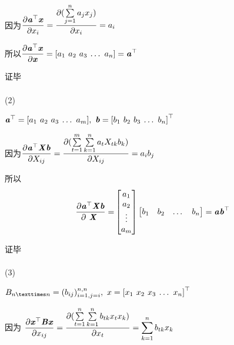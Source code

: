 \documentclass[UTF8]{ctexart}
\begin{document}
因为$\displaystyle{
    \frac{ \partial \mathbf{\textbf {\emph{a}}}^\top  \textbf {\emph{x}}  }
    { \partial \emph {$x_{i}$} } =
    \frac{ \partial ( \sum\limits_{j=1}\limits^n  \emph {$a_{j}$}  \emph {$x_{j}$}  )}
    { \partial \emph {$x_{i}$} }=
    \textbf{\emph {$a_{i}$}}}$



所以$\displaystyle{\frac{ \partial \mathbf{\textbf {\emph {a}}}^\top  \textbf {\emph {x}}  }
{ \partial \textbf{\emph {x}} }=
      [\emph {$a_{1}$\ $a_{2}$\ $a_{3}$\ …\ $a_{n}$}]=
    \mathbf{\textbf{\emph {a}}}^\top}$

证毕
\\
\\
(2)

$\mathbf{\textbf {\emph{a}}}^\top=[\emph {$a_{1}$\ $a_{2}$\ $a_{3}$\ …\ $a_{m}$}],
  \ \textbf {\emph{b}}=\mathbf{[\emph {$b_{1}$\ $b_{2}$\ $b_{3}$\ …\ $b_{n}$}]}^\top$

因为$\displaystyle{
    \frac{ \partial \mathbf{\textbf {\emph{a}}}^\top  \textbf {\emph{X}} \textbf {\emph{b}} }
    { \partial \emph {$X_{ij}$} } =
    \frac{ \partial (\sum\limits_{t=1}\limits^m \sum\limits_{k=1}\limits^n \emph {$a_{t}$}  \emph {$X_{tk}$} \emph {$b_{k}$} )}
    { \partial \emph {$X_{ij}$} }= \emph {$a_{i}$} \emph {$b_{j}$} }$

所以
$$
  \displaystyle{\frac{ \partial \mathbf{\textbf {\emph {a}}}^\top  \textbf {\emph{X}} \textbf {\emph{b}} }
    { \partial \textbf{ \emph {X} }}=}
  \begin{bmatrix}
    a_{1}  \\
    a_{2}  \\
    \vdots \\
    a_{m}
  \end{bmatrix}
  \begin{bmatrix}
    b_{1} & b_{2} & \dots & b_{n}
  \end{bmatrix}
  =\textbf{\emph {a}}\mathbf{\textbf{\emph {b}}}^\top
$$

证毕
\\
\\
(3)

$B_{n×n}=(b_{ij})_{i=1,j=i}^{n,n},\ x=\mathbf{[\emph {$x_{1}$\ $x_{2}$\ $x_{3}$\ …\ $x_{n}$}]}^\top$

因为
$ \displaystyle{
    \frac{ \partial \mathbf{\textbf {\emph{x}}}^\top  \textbf {\emph{B}} \textbf {\emph{x}} }
    { \partial \emph {$x_{ij}$} } =
    \frac{ \partial (\sum\limits_{t=1}\limits^n \sum\limits_{k=1}\limits^n \emph {$b_{tk}$}\emph {$x_{t}$} \emph {$x_{k}$} )}
    { \partial \emph {$x_{t}$} } =
    \sum\limits_{k=1}\limits^n \emph {$b_{tk}$} \emph {$x_{k}$}
  }$
\end{document}
